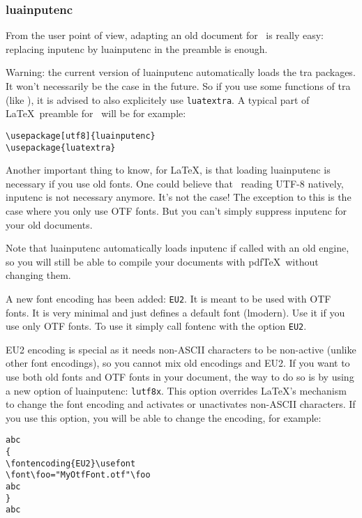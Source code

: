 \documentclass{article}
\begin{document}
\subsubsection{luainputenc}

From the user point of view, adapting an old document for \LuaTeX\ is really
easy: replacing \textsf{inputenc} by \textsf{luainputenc} in the preamble is
enough.

\textsf{Warning:} the current version of \textsf{luainputenc} automatically
loads the \LuaTeX tra packages. It won't necessarily be the case in the
future. So if you use some functions of \LuaTeX tra (like
\texttt{\string\newluaattribute}), it is advised to also explicitely use
\texttt{luatextra}. A typical part of \LaTeX\ preamble for \LuaTeX\ will be
for example:

\begin{verbatim}
\usepackage[utf8]{luainputenc}
\usepackage{luatextra}
\end{verbatim}

Another important thing to know, for \LaTeX , is that loading
\textsf{luainputenc} is necessary if you use old fonts. One could believe that
\LuaTeX\ reading UTF-8 natively, \textsf{inputenc} is not necessary anymore.
It's not the case! The exception to this is the case where you only use OTF
fonts. But you can't simply suppress \textsf{inputenc} for your old documents.

Note that \textsf{luainputenc} automatically loads \textsf{inputenc} if called
with an old engine, so you will still be able to compile your documents with
pdf\TeX\ without changing them.

A new font encoding has been added: \texttt{EU2}. It is meant to be used with
OTF fonts. It is very minimal and just defines a default font (lmodern). Use
it if you use only OTF fonts. To use it simply call \textsf{fontenc} with the
option \texttt{EU2}. 

EU2 encoding is special as it needs non-ASCII characters to be non-active
(unlike other font encodings), so you cannot mix old encodings and EU2. If you
want to use both old fonts and OTF fonts in your document, the way to do so is
by using a new option of \textsf{luainputenc}: \texttt{lutf8x}. This option
overrides \LaTeX 's mechanism to change the font encoding and activates or
unactivates non-ASCII characters. If you use this option, you will be able to
change the encoding, for example:

\begin{verbatim}
abc
{
\fontencoding{EU2}\usefont
\font\foo="MyOtfFont.otf"\foo
abc
}
abc
\end{verbatim} 
\end{document}
